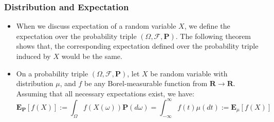 \documentclass[handout]{beamer}
\newcommand{\BP}{\mathbf{P}}
\newcommand{\BE}{\mathbf{E}}
\begin{document}
\frame
{
  \frametitle{Distribution and Expectation}

   \begin{itemize}
  
                \item<1-> When we discuss expectation of a random variable $X$, we define the expectation over the probability triple $(\Omega, \mathcal{F}, \BP)$. The following theorem shows that, the corresponding expectation defined over the probability triple induced by $X$ would be the same. 
                
               \item<2-> [] \begin{Theorem} 
               On a probability triple $(\Omega, \mathcal{F}, \BP)$, let $X$ be random variable  with distribution $\mu$, and $f$ be any Borel-measurable function from $\mathbf{R}\rightarrow \mathbf{R}$. Assuming that all necessary expectations exist, we have:  
               $$\BE_{\BP} [f(X)] := \int_{\Omega} f(X(\omega) )\mathbf{P} (d\omega)  =\int_{-\infty}^{\infty} f(t) \mu(dt) :=\BE_{\mu} [f(X)] $$ 
               \end{Theorem} 
                
                                                      
\end{itemize}
}
\end{document}
